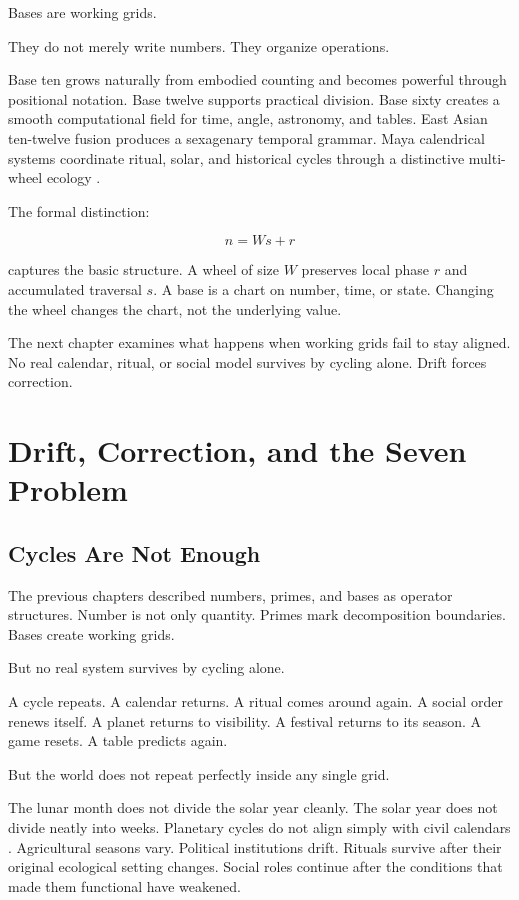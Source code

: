 \documentclass[11pt]{book}
\begin{document}
Bases are working grids.

They do not merely write numbers. They organize operations.

Base ten grows naturally from embodied counting and becomes powerful through positional notation. Base twelve supports practical division. Base sixty creates a smooth computational field for time, angle, astronomy, and tables. East Asian ten-twelve fusion produces a sexagenary temporal grammar. Maya calendrical systems coordinate ritual, solar, and historical cycles through a distinctive multi-wheel ecology \cite{Ifrah2000UniversalHistoryNumbers,Menninger1969NumberWordsSymbols,Neugebauer1957ExactSciences,Robson2008MathematicsAncientIraq,Needham1959ScienceCivilisationChina3,BrickerBricker2011AstronomyMayaCodices}.

The formal distinction:

\[
n = Ws + r
\]

captures the basic structure. A wheel of size \(W\) preserves local phase \(r\) and accumulated traversal \(s\). A base is a chart on number, time, or state. Changing the wheel changes the chart, not the underlying value.

The next chapter examines what happens when working grids fail to stay aligned. No real calendar, ritual, or social model survives by cycling alone. Drift forces correction.

\chapter{Drift, Correction, and the Seven Problem}

\section{Cycles Are Not Enough}

The previous chapters described numbers, primes, and bases as operator structures. Number is not only quantity. Primes mark decomposition boundaries. Bases create working grids.

But no real system survives by cycling alone.

A cycle repeats. A calendar returns. A ritual comes around again. A social order renews itself. A planet returns to visibility. A festival returns to its season. A game resets. A table predicts again.

But the world does not repeat perfectly inside any single grid.

The lunar month does not divide the solar year cleanly. The solar year does not divide neatly into weeks. Planetary cycles do not align simply with civil calendars \cite{Neugebauer1957ExactSciences,Aveni1989EmpiresTime,HungerPingree1999AstralSciences}. Agricultural seasons vary. Political institutions drift. Rituals survive after their original ecological setting changes. Social roles continue after the conditions that made them functional have weakened.
\end{document}
